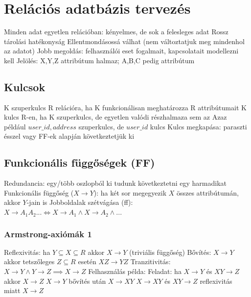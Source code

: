 \documentclass[12pt,a4paper]{article}
\begin{document}
\pagebreak

\section{Relációs adatbázis tervezés}

\begin{outline}
	\1 Minden adat egyetlen relációban: kényelmes, de sok a felesleges adat
		\2 Rossz tárolási hatékonyság
		\2 Ellentmondásossá válhat (nem változtatjuk meg mindenhol az adatot)
	\1 Jobb megoldás: felhasználói eset fogalmait, kapcsolatait modellezni kell
	\1 Jelölés: X,Y,Z attribútum halmaz; A,B,C pedig attribútum
\end{outline}

\subsection{Kulcsok}

\begin{outline}
	\1 K szuperkulcs R relációra, ha K funkcionálisan meghatározza R attribútumait
	\1 K kulcs R-en, ha K szuperkulcs, de egyetlen valódi részhalmaza sem az
	\1 Azaz például $user\_id,address$ szuperkulcs, de $user\_id$ kulcs
	\1 Kulcs megkapása: paraszti ésszel vagy FF-ek alapján következtetjük ki
\end{outline}

\subsection{Funkcionális függőségek (FF)}

\begin{outline}
	\1 Redundancia: egy/több oszlopból ki tudunk következtetni egy harmadikat
	\1 Funkcionális függőség ($X \to Y$): ha két sor megegyezik $X$ összes attribútumán, akkor $Y$-jain is
	\1 Jobboldalak szétvágása (ff): $X \to A_1A_2... \Leftrightarrow X \to A_1 \wedge X \to A_2 \wedge ...$
\end{outline}

\subsubsection{Armstrong-axiómák 1}

\begin{outline}
	\1 Reflexivitás: ha $Y \subseteq X \subseteq R$ akkor $X \to Y$ (triviális függőség)
	\1 Bővítés: $X \to Y$ akkor tetszőleges $Z \subseteq R$ esetén $XZ \to YZ$
	\1 Tranzitivitás: $X \to Y \wedge Y \to Z \implies X \to Z$
	\1 Felhasználás példa:
		\2 Feladat: ha $X \to Y$ és $XY \to Z$ akkor $X \to Z$
		\2 $X \to Y$ bővítés után $X \to XY$
		\2 $X \to XY$ és $XY \to Z$ reflexivitás miatt $X \to Z$
\end{outline}
\end{document}
